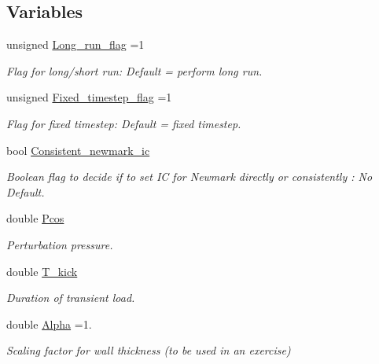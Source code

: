 \subsection*{Variables}
\begin{DoxyCompactItemize}
\item 
unsigned \hyperlink{namespaceGlobal__Physical__Variables_acb18f0e4952b6a1b0840ca94828ace3b}{Long\+\_\+run\+\_\+flag} =1
\begin{DoxyCompactList}\small\item\em Flag for long/short run\+: Default = perform long run. \end{DoxyCompactList}\item 
unsigned \hyperlink{namespaceGlobal__Physical__Variables_aae2e69454e5e73519e13dd3424d41a2c}{Fixed\+\_\+timestep\+\_\+flag} =1
\begin{DoxyCompactList}\small\item\em Flag for fixed timestep\+: Default = fixed timestep. \end{DoxyCompactList}\item 
bool \hyperlink{namespaceGlobal__Physical__Variables_affe3ddb0b7c1d7dbf3955738edbda1af}{Consistent\+\_\+newmark\+\_\+ic}
\begin{DoxyCompactList}\small\item\em Boolean flag to decide if to set IC for Newmark directly or consistently \+: No Default. \end{DoxyCompactList}\item 
double \hyperlink{namespaceGlobal__Physical__Variables_ab55734aaa66260cd9d4bf68a4ecafdd5}{Pcos}
\begin{DoxyCompactList}\small\item\em Perturbation pressure. \end{DoxyCompactList}\item 
double \hyperlink{namespaceGlobal__Physical__Variables_a8a2c0589daf61085e7ebec410cbbbc76}{T\+\_\+kick}
\begin{DoxyCompactList}\small\item\em Duration of transient load. \end{DoxyCompactList}\item 
double \hyperlink{namespaceGlobal__Physical__Variables_aa2e802ee7cc8e1ac900ba94c3ce86eb7}{Alpha} =1.
\begin{DoxyCompactList}\small\item\em Scaling factor for wall thickness (to be used in an exercise) \end{DoxyCompactList}\item 

\end{DoxyCompactItemize}
